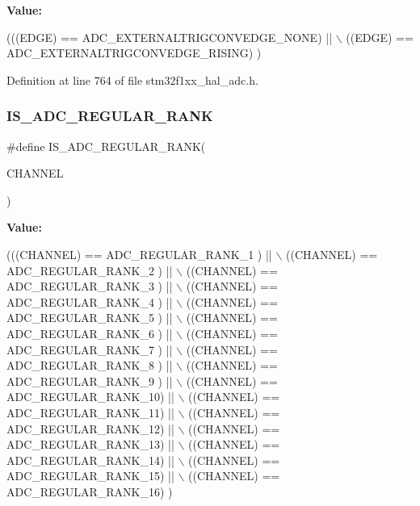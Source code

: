 {\bfseries Value\+:}
\begin{DoxyCode}
(((EDGE) == ADC\_EXTERNALTRIGCONVEDGE\_NONE)  || \(\backslash\)
                                   ((EDGE) == ADC\_EXTERNALTRIGCONVEDGE\_RISING)  )
\end{DoxyCode}


Definition at line 764 of file stm32f1xx\+\_\+hal\+\_\+adc.\+h.

\mbox{\label{group___a_d_c___private___macros_ga5f9a2272b497dd6afd324d6dedbb89dc}} 
\subsubsection{\texorpdfstring{I\+S\+\_\+\+A\+D\+C\+\_\+\+R\+E\+G\+U\+L\+A\+R\+\_\+\+R\+A\+NK}{IS\_ADC\_REGULAR\_RANK}}
{\footnotesize\ttfamily \#define I\+S\+\_\+\+A\+D\+C\+\_\+\+R\+E\+G\+U\+L\+A\+R\+\_\+\+R\+A\+NK(\begin{DoxyParamCaption}\item[{}]{C\+H\+A\+N\+N\+EL }\end{DoxyParamCaption})}

{\bfseries Value\+:}
\begin{DoxyCode}
(((CHANNEL) == ADC\_REGULAR\_RANK\_1 ) || \(\backslash\)
                                      ((CHANNEL) == ADC\_REGULAR\_RANK\_2 ) || \(\backslash\)
                                      ((CHANNEL) == ADC\_REGULAR\_RANK\_3 ) || \(\backslash\)
                                      ((CHANNEL) == ADC\_REGULAR\_RANK\_4 ) || \(\backslash\)
                                      ((CHANNEL) == ADC\_REGULAR\_RANK\_5 ) || \(\backslash\)
                                      ((CHANNEL) == ADC\_REGULAR\_RANK\_6 ) || \(\backslash\)
                                      ((CHANNEL) == ADC\_REGULAR\_RANK\_7 ) || \(\backslash\)
                                      ((CHANNEL) == ADC\_REGULAR\_RANK\_8 ) || \(\backslash\)
                                      ((CHANNEL) == ADC\_REGULAR\_RANK\_9 ) || \(\backslash\)
                                      ((CHANNEL) == ADC\_REGULAR\_RANK\_10) || \(\backslash\)
                                      ((CHANNEL) == ADC\_REGULAR\_RANK\_11) || \(\backslash\)
                                      ((CHANNEL) == ADC\_REGULAR\_RANK\_12) || \(\backslash\)
                                      ((CHANNEL) == ADC\_REGULAR\_RANK\_13) || \(\backslash\)
                                      ((CHANNEL) == ADC\_REGULAR\_RANK\_14) || \(\backslash\)
                                      ((CHANNEL) == ADC\_REGULAR\_RANK\_15) || \(\backslash\)
                                      ((CHANNEL) == ADC\_REGULAR\_RANK\_16)   )
\end{DoxyCode}


